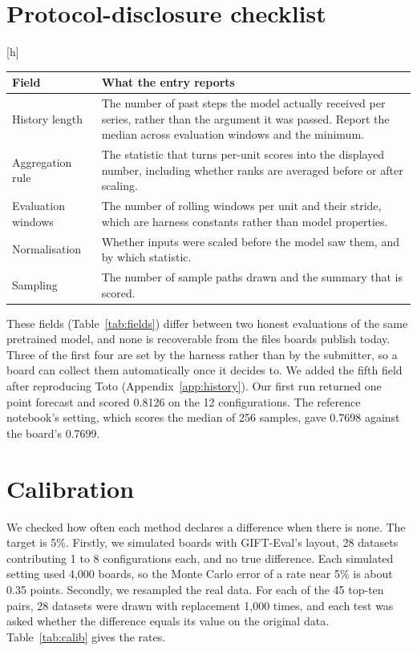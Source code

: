 \documentclass{article}
\makeatletter
\renewenvironment{table}
  {\setlength{\abovecaptionskip}{6\p@}%
   \setlength{\belowcaptionskip}{\z@}%
   \@float{table}}
  {\end@float}
\makeatother
\begin{document}
\section{Protocol-disclosure checklist}
\label{app:checklist}

\begin{table}[h]
\centering
\small
\begin{tabular}{@{}p{3.2cm}p{9.5cm}@{}}
\toprule
\textbf{Field} & \textbf{What the entry reports} \\
\midrule
History length & The number of past steps the model actually received per series, rather than
the argument it was passed. Report the median across evaluation windows and the minimum. \\
Aggregation rule & The statistic that turns per-unit scores into the displayed number,
including whether ranks are averaged before or after scaling. \\
Evaluation windows & The number of rolling windows per unit and their stride, which are
harness constants rather than model properties. \\
Normalisation & Whether inputs were scaled before the model saw them, and by which
statistic. \\
Sampling & The number of sample paths drawn and the summary that is scored. \\
\bottomrule
\end{tabular}
\caption{The five disclosure fields, each a property of the evaluation run rather than of the
model.}
\label{tab:fields}
\end{table}

These fields (Table~\ref{tab:fields}) differ between two honest evaluations of the same pretrained model, and none is
recoverable from the files boards publish today. Three of the first four are set by the
harness rather than by the submitter, so a board can collect them automatically once it decides
to. We added the fifth field after reproducing Toto (Appendix~\ref{app:history}). Our first run
returned one point forecast and scored 0.8126 on the 12 configurations. The reference
notebook's setting, which scores the median of 256 samples, gave 0.7698 against the board's
0.7699.


\section{Calibration}
\label{app:calib}

We checked how often each method declares a difference when there is none. The target is 5\%.
Firstly, we simulated boards with GIFT-Eval's layout, 28 datasets contributing 1 to 8
configurations each, and no true difference. Each simulated setting used 4{,}000 boards, so
the Monte Carlo error of a rate near 5\% is about 0.35 points. Secondly, we resampled the real
data. For each of the 45 top-ten pairs, 28 datasets were drawn with replacement 1{,}000 times,
and each test was asked whether the difference equals its value on the original data.
Table~\ref{tab:calib} gives the rates.
\end{document}

